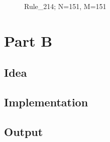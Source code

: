 \documentclass[12pt,a4paper]{article}
\begin{document}
\begin{figure}[H]
    \centering
    \caption{Rule\_214; N=151, M=151}
    \label{fig:your_label}
\end{figure}

\vspace{1cm}





\section{Part B}


\vspace{1cm}

\subsection{Idea}


\vspace{1cm}

\subsection{Implementation}


\vspace{1cm}

\subsection{Output}


\vspace{1cm}



\vspace{1cm}
\end{document}
